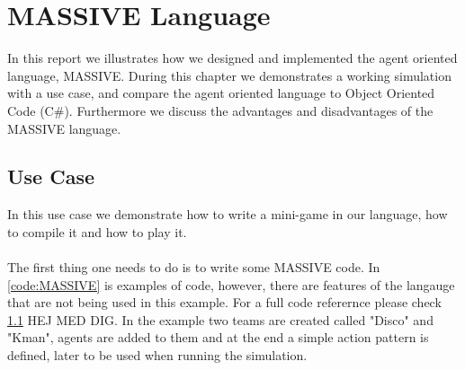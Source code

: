 \chapter{MASSIVE Language}
\label{usecase}

In this report we illustrates how we designed and implemented the agent oriented language, MASSIVE. During this chapter we demonstrates a working simulation with a use case, and compare the agent oriented language to Object Oriented Code (C\#). Furthermore we discuss the advantages and disadvantages of the MASSIVE language. 

\section{Use Case}
In this use case we demonstrate how to write a mini-game in our language, how to compile it and how to play it. \\
 \\
The first thing one needs to do is to write some MASSIVE code. In \ref{code:MASSIVE} is examples of code, however, there are features of the langauge that are not being used in this example. For a full code referernce please check \ref{} HEJ MED DIG. In the example two teams are created called "Disco" and "Kman", agents are added to them and at the end a simple action pattern is defined, later to be used when running the simulation.

